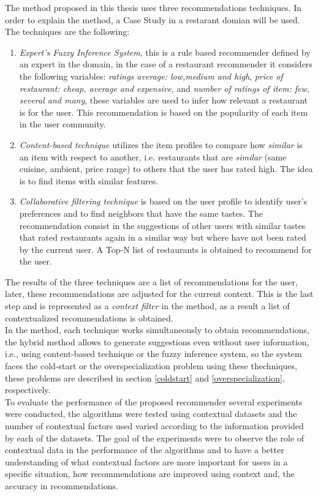 The method proposed in this thesis uses three recommendations techniques.
In order to explain the method, a Case Study in a restarant domian will be used.
The techniques are the following:
\begin{enumerate} 
\item \textit{Expert's Fuzzy Inference System}, this is a rule based recommender
defined by an expert in the domain, in the case of a restaurant recommender
it considers the following
variables: \textit{ratings average: low,medium and high},
\textit{price of restaurant: cheap, average and expensive}, and
\textit{number of ratings of item: few, several and many}, these
variables are used to infer how relevant a restaurant is for the user.
This recommendation is based on the popularity of each item in the
user community.
\item \textit{Content-based technique} utilizes the item profiles 
to compare how \textit{similar} is an item with respect to 
another, i.e. restaurants that are \textit{similar} (same cuisine, 
ambient, price range) to others that the user has rated high. 
The idea is to find items with similar features. 
\item \textit{Collaborative filtering technique} is based on the user
profile to identify user's preferences and to find neighbors that
have the same tastes. The recommendation consist in the suggestions of
other users with similar tastes that rated restaurants again in a
similar way but where have not been rated by the current user. A Top-N
list of restaurants is obtained to recommend for the user.
\end{enumerate} 
The results of the three techniques are a list of recommendations for
the user, later, these recommendations are adjusted for the current context. This
is the last step and is represented as a \textit{context filter} in the
method, as a result a list of contextualized
recommendations is obtained. \\
In the method, each technique works simultaneously to obtain
recommendations, the hybrid method allows to generate suggestions even
without user information, i.e., using content-based technique or the
fuzzy inference system, so the system faces the cold-start or the
overspecialization problem using these thechniques, these problems are
described in section \ref{coldstart} and 
\ref{overspecialization}, respectively.\\
To evaluate the performance of the proposed recommender several experiments
were conducted, the algorithms were tested using contextual datasets and
the number of contextual factors used varied according to the information
provided by each of the datasets. The goal of the experiments were to observe
the role of contextual data  in the performance of the algorithms and to 
have a better understanding of what contextual
factors are more important for users in a specific situation, how recommendations
are improved using context and, the accuracy in recommendations.



